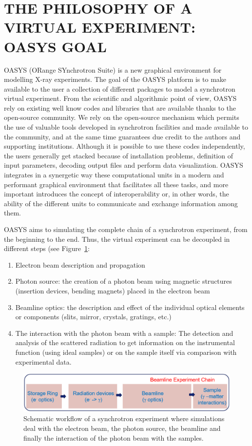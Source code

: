 \documentclass{aip-cp}
\begin{document}
\section{THE PHILOSOPHY OF A VIRTUAL EXPERIMENT: OASYS GOAL}

OASYS (ORange SYnchrotron Suite) is a new graphical environment for modelling X-ray experiments. The goal of the OASYS platform is to make available to the user a collection of different packages to model a synchrotron virtual experiment. From the scientific and algorithmic point of view, OASYS rely on existing well know codes and libraries that are available thanks to the open-source community. We rely on the open-source mechanism which permits the use of valuable tools developed in synchrotron facilities and made available to the community, and at the same time guarantees due credit to the authors and supporting institutions. Although it is possible to use these codes independently, the users generally get stacked because of installation problems, definition of input parameters, decoding output files and perform data visualization. OASYS integrates in a synergetic way these computational units in a modern and performant graphical environment that facilitates all these tasks, and more important introduces the concept of interoperability or, in other words, the ability of the different units to communicate and exchange information among them. 

OASYS aims to simulating the complete chain of a synchrotron experiment, from the beginning to the end. Thus, the virtual experiment can be decoupled in different steps (see Figure~\ref{figChain0}: 
\begin{enumerate}
 \item Electron beam description and propagation
 \item Photon source: the creation of a photon beam using magnetic structures (insertion devices, bending magnets) placed in the electron beam 
 \item Beamline optics: the description and effect of the individual optical elements or components (slits, mirror, crystals, gratings, etc.)
 \item The interaction with the photon beam with a sample: The detection and analysis of the scattered radiation to get information on the instrumental function (using ideal samples) or on the sample itself via comparison with experimental data. 
\end{enumerate}


\begin{figure}[h]
\includegraphics[width=14cm]{FIGURES/chain0.png}
\caption{Schematic workflow of a synchrotron experiment where simulations deal with the electron beam, the photon source, the beamline and finally the interaction of the photon beam with the samples.}
\label{figChain0}
\end{figure}
\end{document}
